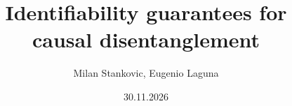 \documentclass[aspectratio=169,10pt,t]{beamer}
\title[Identifiability guarantees for causal disentanglement]{Identifiability guarantees for\\causal disentanglement}
\author{Milan Stankovic, Eugenio Laguna}
\date{30.11.2026}
\institute[Student Seminar in Statistics: Representation Learning]{Student Seminar in Statistics: Representation Learning}
\begin{document}
\begin{frame}[plain]
  \titlepage
\end{frame}

\end{document}

